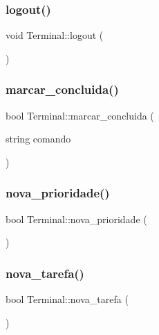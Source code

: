 \mbox{\label{classTerminal_ab5fabe06475207244e238a860e2aa469}} 
\subsubsection{\texorpdfstring{logout()}{logout()}}
{\footnotesize\ttfamily void Terminal\+::logout (\begin{DoxyParamCaption}{ }\end{DoxyParamCaption})}

\mbox{\label{classTerminal_a63b9f303409fd5e787b7918b3d462e51}} 
\subsubsection{\texorpdfstring{marcar\+\_\+concluida()}{marcar\_concluida()}}
{\footnotesize\ttfamily bool Terminal\+::marcar\+\_\+concluida (\begin{DoxyParamCaption}\item[{string}]{comando }\end{DoxyParamCaption})}

\mbox{\label{classTerminal_a15369b06a58cb3b06bfac023e21a2e6e}} 
\subsubsection{\texorpdfstring{nova\+\_\+prioridade()}{nova\_prioridade()}}
{\footnotesize\ttfamily bool Terminal\+::nova\+\_\+prioridade (\begin{DoxyParamCaption}{ }\end{DoxyParamCaption})}

\mbox{\label{classTerminal_a05c347f323568a234ea3e12bc0c64315}} 
\subsubsection{\texorpdfstring{nova\+\_\+tarefa()}{nova\_tarefa()}}
{\footnotesize\ttfamily bool Terminal\+::nova\+\_\+tarefa (\begin{DoxyParamCaption}{ }\end{DoxyParamCaption})}

